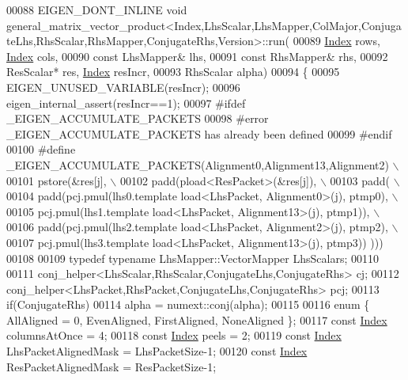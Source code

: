 \begin{DoxyCode}
00088 EIGEN\_DONT\_INLINE \textcolor{keywordtype}{void} 
      general\_matrix\_vector\_product<Index,LhsScalar,LhsMapper,ColMajor,ConjugateLhs,RhsScalar,RhsMapper,ConjugateRhs,Version>::run(
00089   \hyperlink{namespace_eigen_a62e77e0933482dafde8fe197d9a2cfde}{Index} rows, \hyperlink{namespace_eigen_a62e77e0933482dafde8fe197d9a2cfde}{Index} cols,
00090   \textcolor{keyword}{const} LhsMapper& lhs,
00091   \textcolor{keyword}{const} RhsMapper& rhs,
00092         ResScalar* res, \hyperlink{namespace_eigen_a62e77e0933482dafde8fe197d9a2cfde}{Index} resIncr,
00093   RhsScalar alpha)
00094 \{
00095   EIGEN\_UNUSED\_VARIABLE(resIncr);
00096   eigen\_internal\_assert(resIncr==1);
00097 \textcolor{preprocessor}{  #ifdef \_EIGEN\_ACCUMULATE\_PACKETS}
00098 \textcolor{preprocessor}{  #error \_EIGEN\_ACCUMULATE\_PACKETS has already been defined}
00099 \textcolor{preprocessor}{  #endif}
00100 \textcolor{preprocessor}{  #define \_EIGEN\_ACCUMULATE\_PACKETS(Alignment0,Alignment13,Alignment2) \(\backslash\)}
00101 \textcolor{preprocessor}{    pstore(&res[j], \(\backslash\)}
00102 \textcolor{preprocessor}{      padd(pload<ResPacket>(&res[j]), \(\backslash\)}
00103 \textcolor{preprocessor}{        padd( \(\backslash\)}
00104 \textcolor{preprocessor}{      padd(pcj.pmul(lhs0.template load<LhsPacket, Alignment0>(j),    ptmp0), \(\backslash\)}
00105 \textcolor{preprocessor}{      pcj.pmul(lhs1.template load<LhsPacket, Alignment13>(j),   ptmp1)),   \(\backslash\)}
00106 \textcolor{preprocessor}{      padd(pcj.pmul(lhs2.template load<LhsPacket, Alignment2>(j),    ptmp2), \(\backslash\)}
00107 \textcolor{preprocessor}{      pcj.pmul(lhs3.template load<LhsPacket, Alignment13>(j),   ptmp3)) )))}
00108 
00109   \textcolor{keyword}{typedef} \textcolor{keyword}{typename} LhsMapper::VectorMapper LhsScalars;
00110 
00111   conj\_helper<LhsScalar,RhsScalar,ConjugateLhs,ConjugateRhs> cj;
00112   conj\_helper<LhsPacket,RhsPacket,ConjugateLhs,ConjugateRhs> pcj;
00113   \textcolor{keywordflow}{if}(ConjugateRhs)
00114     alpha = numext::conj(alpha);
00115 
00116   \textcolor{keyword}{enum} \{ AllAligned = 0, EvenAligned, FirstAligned, NoneAligned \};
00117   \textcolor{keyword}{const} \hyperlink{namespace_eigen_a62e77e0933482dafde8fe197d9a2cfde}{Index} columnsAtOnce = 4;
00118   \textcolor{keyword}{const} \hyperlink{namespace_eigen_a62e77e0933482dafde8fe197d9a2cfde}{Index} peels = 2;
00119   \textcolor{keyword}{const} \hyperlink{namespace_eigen_a62e77e0933482dafde8fe197d9a2cfde}{Index} LhsPacketAlignedMask = LhsPacketSize-1;
00120   \textcolor{keyword}{const} \hyperlink{namespace_eigen_a62e77e0933482dafde8fe197d9a2cfde}{Index} ResPacketAlignedMask = ResPacketSize-1;

\end{DoxyCode}
